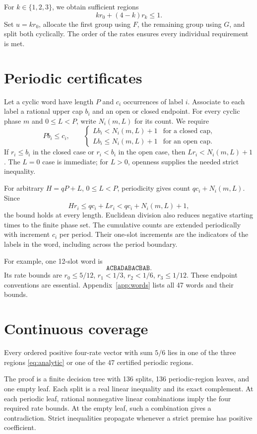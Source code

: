 \documentclass[11pt]{article}
\begin{document}
For $k\in\{1,2,3\}$, we obtain sufficient regions
\begin{equation}\label{eq:analytic}
kr_0+(4-k)r_k\leq1.
\end{equation}
Set $u=kr_0$, allocate the first group using $F$, the remaining group using $G$, and split both cyclically. The order of the rates ensures every individual requirement is met.

\section{Periodic certificates}
Let a cyclic word have length $P$ and $c_i$ occurrences of label $i$. Associate to each label a rational upper cap $b_i$ and an open or closed endpoint. For every cyclic phase $m$ and $0\leq L<P$, write $N_i(m,L)$ for its count. We require
\[
Pb_i\leq c_i,\qquad
\begin{cases}
Lb_i<N_i(m,L)+1&\text{for a closed cap},\\
Lb_i\leq N_i(m,L)+1&\text{for an open cap}.
\end{cases}
\]
If $r_i\leq b_i$ in the closed case or $r_i<b_i$ in the open case, then $Lr_i<N_i(m,L)+1$. The $L=0$ case is immediate; for $L>0$, openness supplies the needed strict inequality.

For arbitrary $H=qP+L$, $0\leq L<P$, periodicity gives count $qc_i+N_i(m,L)$. Since
\[
Hr_i\leq qc_i+Lr_i<qc_i+N_i(m,L)+1,
\]
the bound holds at every length. Euclidean division also reduces negative starting times to the finite phase set. The cumulative counts are extended periodically with increment $c_i$ per period. Their one-slot increments are the indicators of the labels in the word, including across the period boundary.

For example, one 12-slot word is
\[
\texttt{ACBADABACBAB}.
\]
Its rate bounds are $r_0\leq5/12$, $r_1<1/3$, $r_2<1/6$, $r_3\leq1/12$. These endpoint conventions are essential. Appendix~\ref{app:words} lists all 47 words and their bounds.

\section{Continuous coverage}
\begin{lemma}\label{lem:cover}
Every ordered positive four-rate vector with sum $5/6$ lies in one of the three regions \eqref{eq:analytic} or one of the 47 certified periodic regions.
\end{lemma}
The proof is a finite decision tree with 136 splits, 136 periodic-region leaves, and one empty leaf. Each split is a real linear inequality and its exact complement. At each periodic leaf, rational nonnegative linear combinations imply the four required rate bounds. At the empty leaf, such a combination gives a contradiction. Strict inequalities propagate whenever a strict premise has positive coefficient.
\end{document}
